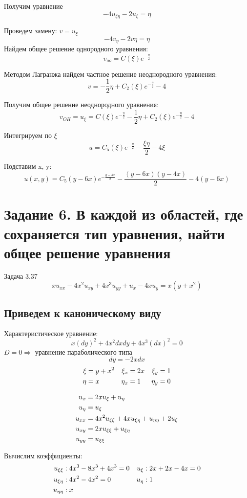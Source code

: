 \documentclass[12pt]{article}
\begin{document}
Получим уравнение
$$-4u_{\xi\eta} - 2u_\xi = \eta$$

Проведем замену:
$v = u_\xi$
$$-4v_\eta - 2v \eta = \eta$$
Найдем общее решение однородного уравнения:
$$v_{oo} = C(\xi)e^{-\frac{\eta}{2}}$$

Методом Лагранжа найдем частное решение неоднородного уравнения:
$$v = -\frac{1}{2}\eta + C_2(\xi)e^{-\frac{\eta}{2}} - 4$$

Получим общее решение неоднородного уравнения:
$$v_{OH} = u_\xi = C(\xi)e^{-\frac{\eta}{2}} -\frac{1}{2}\eta + C_2(\xi)e^{-\frac{\eta}{2}} - 4$$

Интегрируем по $\xi$
$$u = C_5(\xi)e^{-\frac{\eta}{2}} - \frac{\xi\eta}{2} - 4\xi$$

Подставим x, y:
$$u(x,y) = C_5(y-6x)e^{-\frac{y-4x}{2}} - \frac{(y-6x)(y-4x)}{2} - 4(y-6x)$$

\section{Задание 6. В каждой из областей, где сохраняется тип уравнения, найти общее решение уравнения}
Задача 3.37
$$xu_{xx} - 4x^2u_{xy} + 4x^3u_{yy} + u_x - 4xu_y = x(y+x^2)$$

\subsection{Приведем к каноническому виду}
    Характеристическое уравнение:
    $$x(dy)^2 + 4x^2dxdy + 4x^3(dx)^2 = 0$$
    $D = 0 \Rightarrow$ уравнение параболического типа
    $$dy = -2xdx$$
    \begin{align}
        \xi &= y+x^2 &\xi_x &= 2x &\xi_y &= 1 \notag \\
        \eta &= x &\eta_x &= 1 &\eta_y &= 0 \notag  
    \end{align}

    \begin{align}
        u_x &= 2xu_\xi + u_\eta \notag \\
        u_\eta &= u_\xi \notag \\
        u_{xx} &= 4x^2u_{\xi\xi} + 4xu_{\xi\eta} + u_{\eta\eta} + 2u_\xi \notag \\
        u_{xy} &= 2xu_{\xi\xi} + u_{\xi\eta} \notag \\
        u_{yy} &= u_{\xi\xi} \notag
    \end{align}

    Вычислим коэффициенты:
    \begin{align}
    u_{\xi\xi} &: 4x^3 - 8x^3 + 4x^3 = 0 &u_\xi &: 2x+2x-4x = 0 \notag \\
    u_{\xi\eta} &: 4x^2 - 4x^2 = 0 &u_\eta &: 1 \notag \\
    u_{\eta\eta} &: x \notag
    \end{align}
\end{document}
